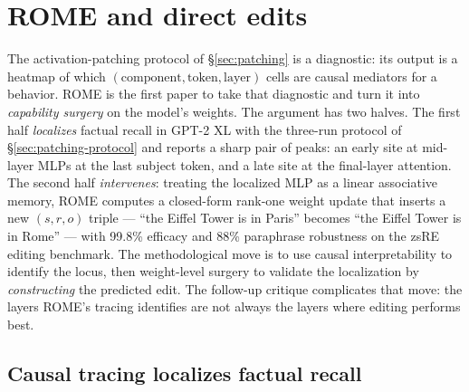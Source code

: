
\section{ROME and direct edits}
\label{sec:rome}
\label{sec:rome-corruption-sensitivity}

The activation-patching protocol of \S\ref{sec:patching} is a diagnostic:
its output is a heatmap of which $(\text{component}, \text{token},
\text{layer})$ cells are causal mediators for a behavior. ROME
\citep{meng2022-rome} is the first paper to take that diagnostic and
turn it into \emph{capability surgery} on the model's weights. The
argument has two halves. The first half \emph{localizes} factual recall
in GPT-2 XL with the three-run protocol of \S\ref{sec:patching-protocol}
and reports a sharp pair of peaks: an early site at mid-layer MLPs at
the last subject token, and a late site at the final-layer attention.
The second half \emph{intervenes}: treating the localized MLP as a
linear associative memory, ROME computes a closed-form rank-one weight
update that inserts a new $(s, r, o)$ triple --- ``the Eiffel Tower is
in Paris'' becomes ``the Eiffel Tower is in Rome'' --- with 99.8\%
efficacy and 88\% paraphrase robustness on the zsRE editing benchmark.
The methodological move is to use causal interpretability to identify
the locus, then weight-level surgery to validate the localization by
\emph{constructing} the predicted edit. The follow-up critique
\citep[Hase et al.\ 2023, ``Does Localization Inform Editing,''
forthcoming]{}  complicates that move: the layers ROME's tracing
identifies are not always the layers where editing performs best.

\subsection{Causal tracing localizes factual recall}
\label{sec:rome-tracing}

